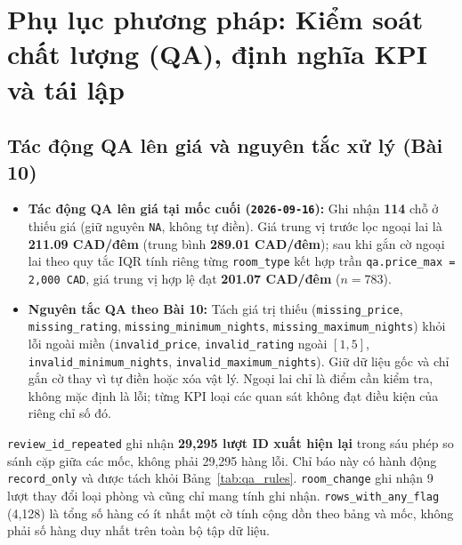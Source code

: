 \FloatBarrier
\section{Phụ lục phương pháp: Kiểm soát chất lượng (QA), định nghĩa KPI và tái lập}

\subsection{Tác động QA lên giá và nguyên tắc xử lý (Bài 10)}

\begin{itemize}
  \item \textbf{Tác động QA lên giá tại mốc cuối (\texttt{2026-09-16}):} Ghi nhận \textbf{114} chỗ ở thiếu giá (giữ nguyên \texttt{NA}, không tự điền). Giá trung vị trước lọc ngoại lai là \textbf{211.09 CAD/đêm} (trung bình \textbf{289.01 CAD/đêm}); sau khi gắn cờ ngoại lai theo quy tắc IQR tính riêng từng \texttt{room\_type} kết hợp trần \texttt{qa.price\_max = 2,000 CAD}, giá trung vị hợp lệ đạt \textbf{201.07 CAD/đêm} ($n = 783$).
  \item \textbf{Nguyên tắc QA theo Bài 10:} Tách giá trị thiếu (\texttt{missing\_price}, \texttt{missing\_rating}, \texttt{missing\_minimum\_nights}, \texttt{missing\_maximum\_nights}) khỏi lỗi ngoài miền (\texttt{invalid\_price}, \texttt{invalid\_rating} ngoài $[1,5]$, \texttt{invalid\_minimum\_nights}, \texttt{invalid\_maximum\_nights}). Giữ dữ liệu gốc và chỉ gắn cờ thay vì tự điền hoặc xóa vật lý. Ngoại lai chỉ là điểm cần kiểm tra, không mặc định là lỗi; từng KPI loại các quan sát không đạt điều kiện của riêng chỉ số đó.
\end{itemize}

\texttt{review\_id\_repeated} ghi nhận \textbf{29,295 lượt ID xuất hiện lại} trong sáu phép so sánh cặp giữa các mốc, không phải 29,295 hàng lỗi. Chỉ báo này có hành động \texttt{record\_only} và được tách khỏi Bảng~\ref{tab:qa_rules}. \texttt{room\_change} ghi nhận 9 lượt thay đổi loại phòng và cũng chỉ mang tính ghi nhận. \texttt{rows\_with\_any\_flag} (4,128) là tổng số hàng có ít nhất một cờ tính cộng dồn theo bảng và mốc, không phải số hàng duy nhất trên toàn bộ tập dữ liệu.

